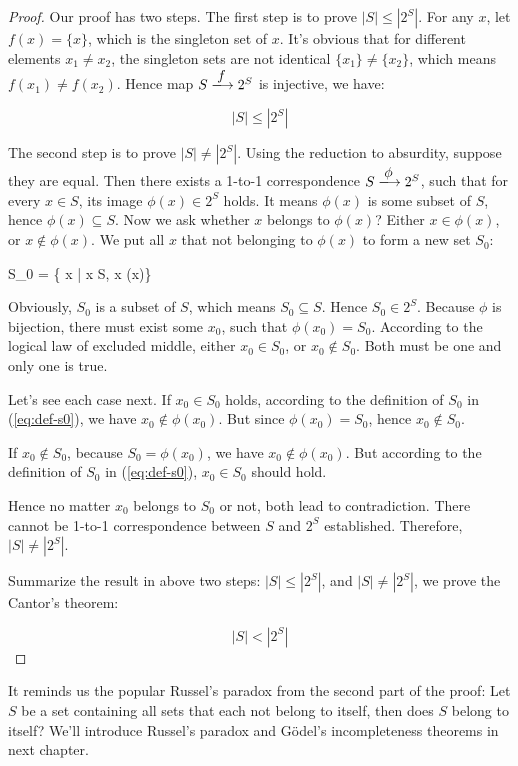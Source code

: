 \documentclass{article}
\begin{document}
\begin{proof}
Our proof has two steps. The first step is to prove $|S| \leq |2^S|$. For any $x$, let $f(x) = \{x\}$, which is the singleton set of $x$. It's obvious that for different elements $x_1 \neq x_2$, the singleton sets are not identical $\{x_1\} \neq \{x_2\}$, which means $f(x_1) \neq f(x_2)$. Hence map $S \arrowto{f} 2^S$ is injective, we have:

\[
  |S| \leq |2^S|
\]

The second step is to prove $|S| \neq |2^S|$. Using the reduction to absurdity, suppose they are equal. Then there exists a 1-to-1 correspondence $S \arrowto{\phi} 2^S$, such that for every $x \in S$, its image $\phi(x) \in 2^S$ holds. It means $\phi(x)$ is some subset of $S$, hence $\phi(x) \subseteq S$. Now we ask whether $x$ belongs to $\phi(x)$? Either $x \in \phi(x)$, or $x \notin \phi(x)$. We put all $x$ that not belonging to $\phi(x)$ to form a new set $S_0$:

\be
S_0 = \{ x | x \in S,  x \notin \phi(x)\}
\label{eq:def-s0}
\ee

Obviously, $S_0$ is a subset of $S$, which means $S_0 \subseteq S$. Hence $S_0 \in 2^S$. Because $\phi$ is bijection, there must exist some $x_0$, such that $\phi(x_0) = S_0$. According to the logical law of excluded middle, either $x_0 \in S_0$, or $x_0 \notin S_0$. Both must be one and only one is true.

Let's see each case next. If $x_0 \in S_0$ holds, according to the definition of $S_0$ in (\ref{eq:def-s0}), we have $x_0 \notin \phi(x_0)$. But since $\phi(x_0) = S_0$, hence $x_0 \notin S_0$.

If $x_0 \notin S_0$, because $S_0 = \phi(x_0)$, we have $x_0 \notin \phi(x_0)$. But according to the definition of $S_0$ in (\ref{eq:def-s0}), $x_0 \in S_0$ should hold.

Hence no matter $x_0$ belongs to $S_0$ or not, both lead to contradiction. There cannot be 1-to-1 correspondence between $S$ and $2^S$ established. Therefore, $|S| \neq |2^S|$.

Summarize the result in above two steps: $|S| \leq |2^S|$, and $|S| \neq |2^S|$, we prove the Cantor's theorem:

\[
  |S| < |2^S|
\]
\end{proof}

It reminds us the popular Russel's paradox from the second part of the proof: Let $S$ be a set containing all sets that each not belong to itself, then does $S$ belong to itself? We'll introduce Russel's paradox and Gödel's incompleteness theorems in next chapter.
\end{document}
